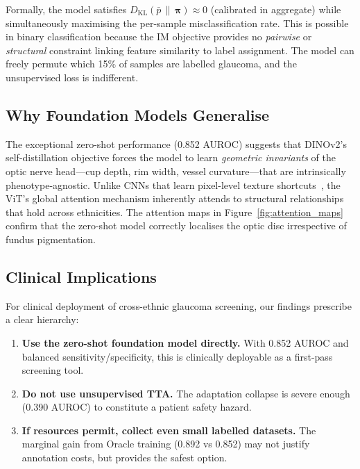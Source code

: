 \documentclass[11pt,twocolumn]{article}
\begin{document}
Formally, the model satisfies $D_{\mathrm{KL}}(\bar{p} \,\|\, \boldsymbol{\pi}) \approx 0$ (calibrated in aggregate) while simultaneously maximising the per-sample misclassification rate. This is possible in binary classification because the IM objective provides no \emph{pairwise} or \emph{structural} constraint linking feature similarity to label assignment. The model can freely permute which 15\% of samples are labelled glaucoma, and the unsupervised loss is indifferent.

\subsection{Why Foundation Models Generalise}
\label{sec:why_generalise}

The exceptional zero-shot performance (0.852 AUROC) suggests that DINOv2's self-distillation objective forces the model to learn \emph{geometric invariants} of the optic nerve head---cup depth, rim width, vessel curvature---that are intrinsically phenotype-agnostic. Unlike CNNs that learn pixel-level texture shortcuts~\citep{li2018efficacy}, the ViT's global attention mechanism inherently attends to structural relationships that hold across ethnicities. The attention maps in Figure~\ref{fig:attention_maps} confirm that the zero-shot model correctly localises the optic disc irrespective of fundus pigmentation.

\subsection{Clinical Implications}
\label{sec:clinical}

For clinical deployment of cross-ethnic glaucoma screening, our findings prescribe a clear hierarchy:

\begin{enumerate}[leftmargin=*,itemsep=2pt]
    \item \textbf{Use the zero-shot foundation model directly.} With 0.852 AUROC and balanced sensitivity/specificity, this is clinically deployable as a first-pass screening tool.
    \item \textbf{Do not use unsupervised TTA.} The adaptation collapse is severe enough (0.390 AUROC) to constitute a patient safety hazard.
    \item \textbf{If resources permit, collect even small labelled datasets.} The marginal gain from Oracle training (0.892 vs 0.852) may not justify annotation costs, but provides the safest option.
\end{enumerate}
\end{document}
